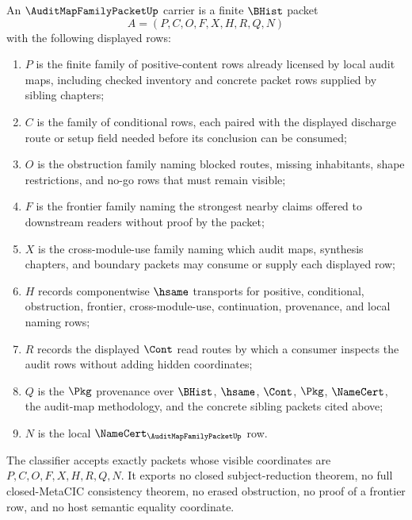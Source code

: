 \begin{definition}
\label{def:audit-map-family-packet-carrier}
An $\AuditMapFamilyPacketUp$ carrier is a finite $\BHist$ packet
$$
A=(P,C,O,F,X,H,R,Q,N)
$$
with the following displayed rows:
\begin{enumerate}
\item $P$ is the finite family of positive-content rows already licensed by local audit maps, including checked inventory and concrete packet rows supplied by sibling chapters;
\item $C$ is the family of conditional rows, each paired with the displayed discharge route or setup field needed before its conclusion can be consumed;
\item $O$ is the obstruction family naming blocked routes, missing inhabitants, shape restrictions, and no-go rows that must remain visible;
\item $F$ is the frontier family naming the strongest nearby claims offered to downstream readers without proof by the packet;
\item $X$ is the cross-module-use family naming which audit maps, synthesis chapters, and boundary packets may consume or supply each displayed row;
\item $H$ records componentwise $\hsame$ transports for positive, conditional, obstruction, frontier, cross-module-use, continuation, provenance, and local naming rows;
\item $R$ records the displayed $\Cont$ read routes by which a consumer inspects the audit rows without adding hidden coordinates;
\item $Q$ is the $\Pkg$ provenance over $\BHist$, $\hsame$, $\Cont$, $\Pkg$, $\NameCert$, the audit-map methodology, and the concrete sibling packets cited above;
\item $N$ is the local $\NameCert_{\AuditMapFamilyPacketUp}$ row.
\end{enumerate}
The classifier accepts exactly packets whose visible coordinates are $P,C,O,F,X,H,R,Q,N$. It exports no closed subject-reduction theorem, no full closed-MetaCIC consistency theorem, no erased obstruction, no proof of a frontier row, and no host semantic equality coordinate.
\end{definition}

